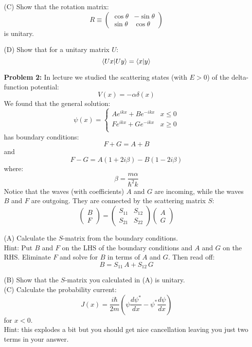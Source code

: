 \documentclass[12pt]{article}
\begin{document}
\noindent
(C) Show that the rotation matrix:
$$R \equiv  \begin{pmatrix} \cos\theta & -\sin\theta \\ \sin\theta & \cos\theta \end{pmatrix}$$
is unitary.

\vskip 1cm

\noindent
(D) Show that for a unitary matrix $U$:
$$\braket{Ux|Uy} = \braket{x|y}$$


\newpage


\noindent
{\bf Problem 2:} 
In lecture we studied the scattering states (with $E>0$) of the delta-function potential:
$$V(x) = -\alpha \delta(x)$$
We found that the general solution:
$$\psi(x) = \begin{cases}
A e^{\displaystyle ikx} + B e^{\displaystyle -ikx} &  x\leq0 \\
F e^{\displaystyle ikx} + G e^{\displaystyle -ikx} &  x\geq0 \\
\end{cases}
$$
has boundary conditions:
$$F+G = A + B$$
and
$$F-G = A (1+2i\beta) - B (1-2i\beta) $$
where:
$$\beta = \frac{m \alpha}{\hbar^2 k}$$
Notice that the waves (with coefficients) $A$ and $G$ are incoming, while the waves $B$ and $F$ are outgoing.  They are connected by the scattering matrix $S$:
$$
\begin{pmatrix} B \\ F \end{pmatrix}
=
\begin{pmatrix} S_{11} & S_{12} \\ S_{21} & S_{22} \end{pmatrix}
\begin{pmatrix} A \\ G \end{pmatrix}
$$

\noindent
(A) Calculate the $S$-matrix from the boundary conditions.\\

\noindent
Hint:  Put $B$ and $F$ on the LHS of the boundary conditions and $A$ and $G$ on the RHS.  Eliminate $F$ and solve for $B$ in terms of $A$ and $G$.  Then read off:
$$B = S_{11} \, A + S_{12} \, G$$

\noindent
(B) Show that the $S$-matrix you calculated in (A) is unitary.\\

\noindent
(C) Calculate the probability current:
$$J(x) = \frac{i\hbar}{2m} \left(\psi\frac{d\psi^*}{dx} - \psi^*\frac{d\psi}{dx} \right)$$
for $x<0$.\\
Hint: this explodes a bit but you should get nice cancellation leaving you just two terms in your answer.\\
\end{document}
